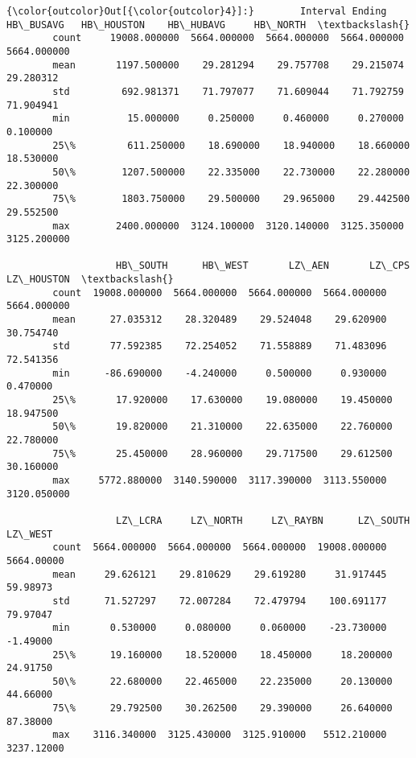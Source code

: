 \documentclass[11pt]{article}
\begin{document}
\begin{Verbatim}[commandchars=\\\{\}]
{\color{outcolor}Out[{\color{outcolor}4}]:}        Interval Ending    HB\_BUSAVG   HB\_HOUSTON    HB\_HUBAVG     HB\_NORTH  \textbackslash{}
        count     19008.000000  5664.000000  5664.000000  5664.000000  5664.000000   
        mean       1197.500000    29.281294    29.757708    29.215074    29.280312   
        std         692.981371    71.797077    71.609044    71.792759    71.904941   
        min          15.000000     0.250000     0.460000     0.270000     0.100000   
        25\%         611.250000    18.690000    18.940000    18.660000    18.530000   
        50\%        1207.500000    22.335000    22.730000    22.280000    22.300000   
        75\%        1803.750000    29.500000    29.965000    29.442500    29.552500   
        max        2400.000000  3124.100000  3120.140000  3125.350000  3125.200000   
        
                   HB\_SOUTH      HB\_WEST       LZ\_AEN       LZ\_CPS   LZ\_HOUSTON  \textbackslash{}
        count  19008.000000  5664.000000  5664.000000  5664.000000  5664.000000   
        mean      27.035312    28.320489    29.524048    29.620900    30.754740   
        std       77.592385    72.254052    71.558889    71.483096    72.541356   
        min      -86.690000    -4.240000     0.500000     0.930000     0.470000   
        25\%       17.920000    17.630000    19.080000    19.450000    18.947500   
        50\%       19.820000    21.310000    22.635000    22.760000    22.780000   
        75\%       25.450000    28.960000    29.717500    29.612500    30.160000   
        max     5772.880000  3140.590000  3117.390000  3113.550000  3120.050000   
        
                   LZ\_LCRA     LZ\_NORTH     LZ\_RAYBN      LZ\_SOUTH     LZ\_WEST  
        count  5664.000000  5664.000000  5664.000000  19008.000000  5664.00000  
        mean     29.626121    29.810629    29.619280     31.917445    59.98973  
        std      71.527297    72.007284    72.479794    100.691177    79.97047  
        min       0.530000     0.080000     0.060000    -23.730000    -1.49000  
        25\%      19.160000    18.520000    18.450000     18.200000    24.91750  
        50\%      22.680000    22.465000    22.235000     20.130000    44.66000  
        75\%      29.792500    30.262500    29.390000     26.640000    87.38000  
        max    3116.340000  3125.430000  3125.910000   5512.210000  3237.12000  
\end{Verbatim}
            
\end{document}
